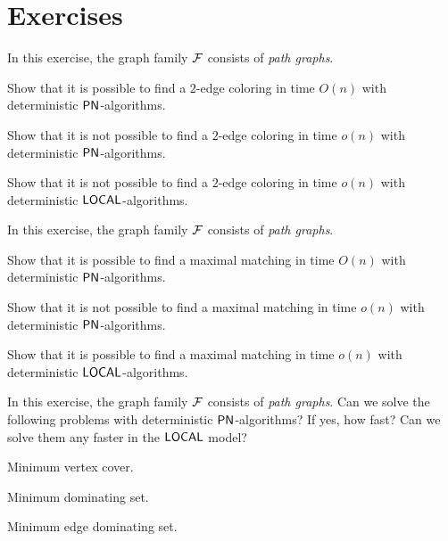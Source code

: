 \section{Exercises}

\begin{ex}
    In this exercise, the graph family $\mathcal{F}$ consists of \emph{path graphs}.
    \begin{subex}
        \item Show that it is possible to find a $2$-edge coloring in time $O(n)$ with deterministic $\textup{\sffamily PN}$-algorithms.
        \item Show that it is not possible to find a $2$-edge coloring in time $o(n)$ with deterministic $\textup{\sffamily PN}$-algorithms.
        \item Show that it is not possible to find a $2$-edge coloring in time $o(n)$ with deterministic $\textup{\sffamily LOCAL}$-algorithms.
    \end{subex}
\end{ex}

\begin{ex}
    In this exercise, the graph family $\mathcal{F}$ consists of \emph{path graphs}.
    \begin{subex}
        \item Show that it is possible to find a maximal matching in time $O(n)$ with deterministic $\textup{\sffamily PN}$-algorithms.
        \item Show that it is not possible to find a maximal matching in time $o(n)$ with deterministic $\textup{\sffamily PN}$-algorithms.
        \item Show that it is possible to find a maximal matching in time $o(n)$ with deterministic $\textup{\sffamily LOCAL}$-algorithms.
    \end{subex}
\end{ex}

\begin{ex}[optimization]
    In this exercise, the graph family $\mathcal{F}$ consists of \emph{path graphs}. Can we solve the following problems with deterministic $\textup{\sffamily PN}$-algorithms? If yes, how fast? Can we solve them any faster in the $\textup{\sffamily LOCAL}$ model?
    \begin{subex}
        \item Minimum vertex cover.
        \item Minimum dominating set.
        \item Minimum edge dominating set.
    \end{subex}
\end{ex}

